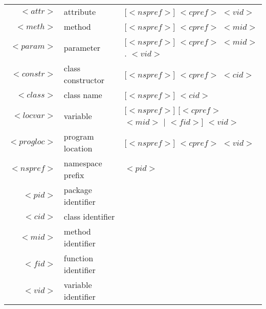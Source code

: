 \documentclass[preview,border=20pt,varwidth]{standalone}
\begin{document}
\begin{adjustwidth}{-0.4cm}{}
\begin{small}
\begin{tabular}{ r l l }
    $<attr>$ & attribute & [$<nspref>$] $<cpref>$ $<vid>$ \\
    $<meth>$ & method & [$<nspref>$] $<cpref>$ $<mid>$ \\
    $<param>$ & parameter & [$<nspref>$] $<cpref>$ $<mid>$ $.$ $<vid>$ \\
    $<constr>$ & class constructor & [$<nspref>$] $<cpref>$ $<cid>$ \\
    $<class>$ & class name & [$<nspref>$] $<cid>$ \\
    $<locvar>$ & variable & [$<nspref>$] [$<cpref>$ $<mid>$ $|$ $<fid>$] $<vid>$ \\
    $<progloc>$ & program location & [$<nspref>$] $<cpref>$ $<vid>$ \\
    $<nspref>$ & namespace prefix & $<pid>$ \\
    $<pid>$ & package identifier & \\
    $<cid>$ & class identifier & \\
    $<mid>$ & method identifier & \\
    $<fid>$ & function identifier & \\
    $<vid>$ & variable identifier & \\
\end{tabular}
\end{small}
\end{adjustwidth}
\end{document}
